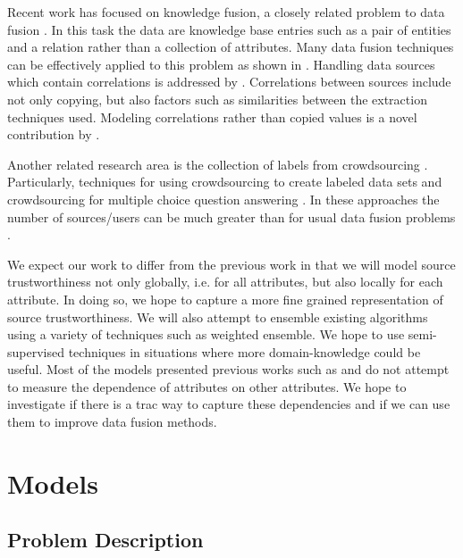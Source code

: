 \documentclass{acm_proc_article-sp}
\begin{document}
Recent work has focused on knowledge fusion, a closely related problem to data fusion \cite{dong:data} \cite{pochampally:fusing} \cite{yu:wisdom}.  In this task the data are knowledge base entries such as a pair of entities and a relation rather than a collection of attributes. Many data fusion techniques can be effectively applied to this problem as shown in \cite{dong:data}. Handling data sources which contain correlations is addressed by \cite{pochampally:fusing}. Correlations between sources include not only copying, but also factors such as similarities between the extraction techniques used. Modeling correlations rather than copied values is a novel contribution by  \cite{pochampally:fusing}.


Another related research area is the collection of labels from crowdsourcing \cite{nguyen:minimizing}. Particularly, techniques for using crowdsourcing to create labeled data sets \cite{sheng:get} \cite{nguyen:minimizing} and crowdsourcing for multiple choice question answering \cite{bachrach:grade}. In these approaches the number of sources/users can be much greater than for usual data fusion problems \cite{li:truth} \cite{nguyen:minimizing}.

We expect our work to differ from the previous work in that we will model source trustworthiness not only globally, i.e. for all attributes, but also locally for each attribute. In doing so, we hope to capture a more fine grained representation of source trustworthiness. We will also attempt to ensemble existing algorithms using a variety of techniques such as weighted ensemble. We hope to use semi-supervised techniques in situations where more domain-knowledge could be useful. Most of the models presented previous works such as \cite{pasternack:latent} and \cite{li:resolving} do not attempt to measure the dependence of attributes on other attributes. We hope to investigate if there is a trac
 way to capture these dependencies and if we can use them to improve data fusion methods.

\section{Models}

\subsection{Problem Description}
\end{document}
